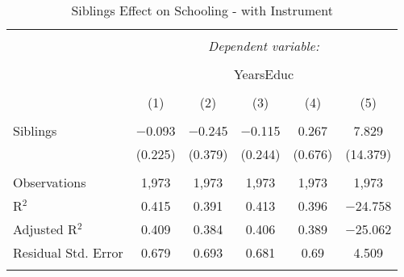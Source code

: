 
\begin{table}[H] \centering 
  \caption{Siblings Effect on Schooling - with Instrument} 
  \label{} 
\begin{tabular}{@{\extracolsep{5pt}}lccccc} 
\\[-1.8ex]\hline 
\hline \\[-1.8ex] 
 & \multicolumn{5}{c}{\textit{Dependent variable:}} \\ 
\cline{2-6} 
\\[-1.8ex] & \multicolumn{5}{c}{YearsEduc} \\ 
\\[-1.8ex] & (1) & (2) & (3) & (4) & (5)\\ 
\hline \\[-1.8ex] 
 Siblings & $-$0.093 & $-$0.245 & $-$0.115 & 0.267 & 7.829 \\ 
  & (0.225) & (0.379) & (0.244) & (0.676) & (14.379) \\ 
 \hline \\[-1.8ex] 
Observations & 1,973 & 1,973 & 1,973 & 1,973 & 1,973 \\ 
R$^{2}$ & 0.415 & 0.391 & 0.413 & 0.396 & $-$24.758 \\ 
Adjusted R$^{2}$ & 0.409 & 0.384 & 0.406 & 0.389 & $-$25.062 \\ 
Residual Std. Error & 0.679 & 0.693 & 0.681 & 0.69 & 4.509 \\ 
\hline 
\hline \\[-1.8ex] 
\end{tabular} 
\end{table} 
